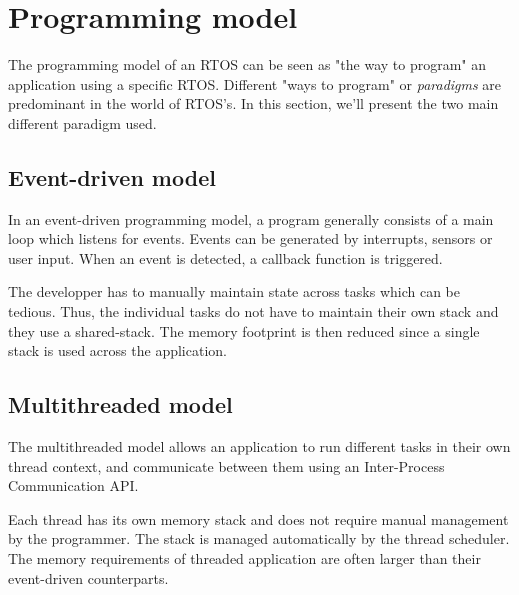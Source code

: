 \section{Programming model}
The programming model of an RTOS can be seen as "the way to program" an application using a specific RTOS.
Different "ways to program" or \textit{paradigms} are predominant in the world of RTOS's.
In this section, we'll present the two main different paradigm used.


\subsection{Event-driven model}
In an event-driven programming model, a program generally consists of a main loop which listens for events.
Events can be generated by interrupts, sensors or user input.
When an event is detected, a callback function is triggered.

The developper has to manually maintain state across tasks which can be tedious.
Thus, the individual tasks do not have to maintain their own stack and they use a shared-stack.
The memory footprint is then reduced since a single stack is used across the application.

\subsection{Multithreaded model}
The multithreaded model allows an application to run different tasks in their own thread context,
    and communicate between them using an Inter-Process Communication API.

Each thread has its own memory stack and does not require manual management by the programmer.
The stack is managed automatically by the thread scheduler.
The memory requirements of threaded application are often larger than their event-driven counterparts.